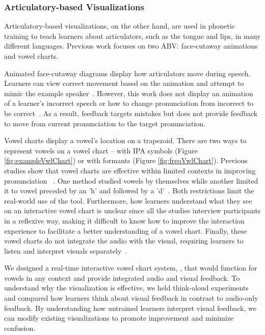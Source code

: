 \subsubsection{Articulatory-based Visualizations}
Articulatory-based visualizations, on the other hand, are used in phonetic training to teach learners about articulators, such as the tongue and lips, in many different languages. Previous work focuses on two ABV: face-cutaway animations and vowel charts.

Animated face-cutaway diagrams display how articulators move during speech. Learners can view correct movement based on the animation and attempt to mimic the example speaker~\cite{bu2021pteacher}. However, this work does not display an animation of a learner's incorrect speech or how to change pronunciation from incorrect to be correct~\cite{bu2021pteacher}. As a result, feedback targets mistakes but does not provide feedback to move from current pronunciation to the target pronunciation.

Vowel charts display a vowel's location on a trapezoid. There are two ways to represent vowels on a vowel chart -- with IPA symbols (Figure \ref{fig:exampleVwlChart}) or with formants (Figure \ref{fig:freqVwlChart}). Previous studies show that vowel charts are effective within limited contexts in improving pronunciation ~\cite{paganus2006vowel,rehman2021real}. One method studied vowels by themselves while another limited it to vowel preceded by an 'h' and followed by a 'd'~\cite{paganus2006vowel,rehman2021real}. Both restrictions limit the real-world use of the tool. Furthermore, how learners understand what they see on an interactive vowel chart is unclear since all the studies interview participants in a reflexive way, making it difficult to know how to improve the interaction experience to facilitate a better understanding of a vowel chart. Finally, these vowel charts do not integrate the audio with the visual, requiring learners to listen and interpret visuals separately~\cite{paganus2006vowel,rehman2021real}.  

We designed a real-time interactive vowel chart system, \visowel{}, that would function for vowels in any context and provide integrated audio and visual feedback. To understand why the visualization is effective, we held think-aloud experiments and compared how learners think about visual feedback in contrast to audio-only feedback. By understanding how untrained learners interpret visual feedback, we can modify existing visualizations to promote improvement and minimize confusion. 


